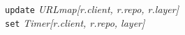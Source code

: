 \begin{algorithm}
{{		}
	\texttt{update} \emph{URLmap[r.client, r.repo, r.layer]} \\
	\texttt{set} \emph{Timer[r.client, r.repo, layer]} \\
	}
\end{algorithm}

%

%


